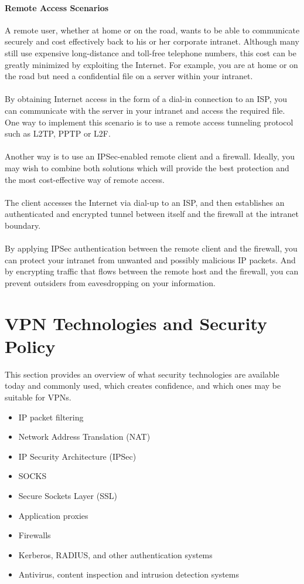 \documentclass[10pt,a4paper]{article}
\begin{document}
\subsection{Remote Access Scenarios}

A remote user, whether at home or on the road, wants to be able to communicate
securely and cost effectively back to his or her corporate intranet. Although many
still use expensive long-distance and toll-free telephone numbers, this cost can
be greatly minimized by exploiting the Internet. For example, you are at home or
on the road but need a confidential file on a server within your intranet. 
\\
\\
By
obtaining Internet access in the form of a dial-in connection to an ISP, you can
communicate with the server in your intranet and access the required file.
One way to implement this scenario is to use a remote access tunneling protocol
such as L2TP, PPTP or L2F. 
\\
\\
Another way is to use an IPSec-enabled remote
client and a firewall. Ideally, you may wish to combine both
solutions which will provide the best protection and the most cost-effective way of
remote access. 
\\
\\
The client accesses the Internet via dial-up to an ISP, and then
establishes an authenticated and encrypted tunnel between itself and the firewall
at the intranet boundary.
\\
\\
By applying IPSec authentication between the remote client and the firewall, you
can protect your intranet from unwanted and possibly malicious IP packets. And
by encrypting traffic that flows between the remote host and the firewall, you can
prevent outsiders from eavesdropping on your information.

\newpage
\part{VPN Technologies and Security Policy}
This section provides an overview
of what security technologies are available today and commonly used, which
creates confidence, and which ones may be suitable for VPNs.
\begin{itemize}
\item IP packet filtering
\item Network Address Translation (NAT)
\item IP Security Architecture (IPSec)
\item SOCKS
\item Secure Sockets Layer (SSL)
\item Application proxies
\item Firewalls
\item Kerberos, RADIUS, and other authentication systems
\item Antivirus, content inspection and intrusion detection systems
\end{itemize}
\end{document}
